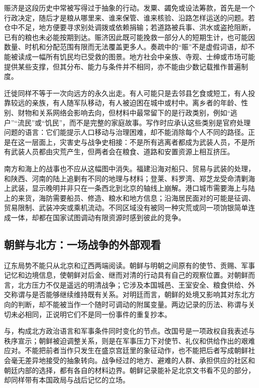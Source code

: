 赈济是这段历史中常被写得过于抽象的行动。发粟、蠲免或设法筹款，首先是一个行政决定，随后才是粮从哪里来、谁来保管、谁来核验、沿路怎样运送的问题。若仓中不足，地方便要寻求别处调拨或依赖捐输；若道路被兵事、洪水或盗抢阻断，已有的粮也未必能按期到达。赈济因此既可能挽救一部分人的短期生计，也可能因数量、时机和分配范围有限而无法覆盖更多人。奏疏中的“赈”不是虚假词语，却不能被读成一幅所有饥民均已受救的图景。地方社会中亲族、寺观、士绅或市场可能提供某些支撑，但其分布、能力与条件并不相同，亦不能由少数记载推作普遍制度。

迁徙同样不等于一次向远方的永久出走。有人可能只是去邻县乞食或短工，有人投靠较远的亲族，有人随军队移动，有人被迫困在城中或村中。离乡者的年龄、性别、财物和关系网络会影响去向，但材料中最常留下的是行政类别，例如“逃户”“流民”或“饥民”，而不是完整的家庭故事。写作时应承认这些类别是官府处理问题的语言：它们能提示人口移动与治理困难，却不能消除每个人不同的路径。正是在这一层面上，灾害史与战争史相接：不是所有逃离者都成为武装人员，不是所有武装人员都由灾荒产生，但两者会在粮食、道路和安置资源上相互挤压。

南方和海上的战事也不应从这幅图中消失。福建沿海对船只、贸易与武装的处理，和陕西、河南的陆上追剿有不同的地理与材料；登莱、料罗湾、郑芝龙受命清剿海上武装，显示晚明并非只在一条西北到北京的轴线上崩解。港口城市需要海上与陆上的来货，海防需要船员、修造、粮水和地方信息；沿海居民面对的可能是征调、贸易限制、武装冲突或乘机流动。不同区域没有被同一种灾荒或同一项饷银简单连成一体，却都在国家试图调动有限资源时感到彼此的竞争。

\subsection{朝鲜与北方：一场战争的外部观看}

辽东局势不能只从北京和辽西两端阅读。朝鲜与明朝之间原有的使节、贡赐、军事记忆和边境信息，使朝鲜对后金、继而对清的行动具有自己的观察位置。对朝鲜而言，北方压力不仅是遥远的明清战争；它涉及本国城邑、王室安全、粮食供给、外交称谓与是否能够继续维持既有关系。对明廷而言，朝鲜的处境又影响其对东北方向的判断，却不能被当作一个随时可调动的附属变量。两边记录的历法、称谓与关切未必相同，正说明它们不是同一份事件的重复抄本。

与，构成北方政治语言和军事条件同时变化的节点。改国号是一项政权自我表述与秩序宣示；朝鲜被迫调整关系，则是在军事压力下对使节、礼仪和供给作出的艰难应对。不能把前者当作只发生在盛京宫廷里的象征动作，也不能把后者写成朝鲜社会毫无差异地接受的抽象转向。战争经过的地方、避难的人群、承担供应的社区和朝廷内部的选择，都有各自的材料边界。朝鲜记录能补足北京文书看不见的部分，却同样带有本国政局与战后记忆的立场。

